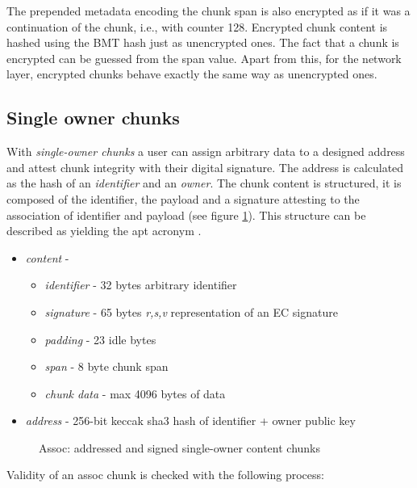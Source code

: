 The prepended metadata encoding the chunk span is also encrypted as if it was a continuation of the chunk, i.e., with counter 128. Encrypted chunk content is hashed using the BMT hash just as unencrypted ones. The fact that a chunk is encrypted can be guessed from the span value. Apart from this, for the network layer, encrypted chunks behave exactly the same way as unencrypted ones.

\subsection{Single owner chunks}\label{sec:single-owner-chunks}

With \emph{single-owner chunks} a user can assign arbitrary data to a designed address and attest chunk integrity with their digital signature. The address is calculated as the hash of an \emph{identifier} and an \emph{owner}. The chunk content is structured, it is composed of the identifier, the payload and a signature attesting to the association of identifier and payload (see figure \ref{fig:single-owner-chunks}). This structure can be described as  yielding the apt acronym .

\begin{itemize}
    \item \emph{content} - 
\begin{itemize}
    \item \emph{identifier} - 32 bytes arbitrary identifier 
    \item \emph{signature} - 65 bytes \emph{r,s,v} representation of an EC signature
    \item \emph{padding} - 23 idle bytes
    \item \emph{span} - 8 byte chunk span
    \item \emph{chunk data} - max 4096 bytes of data
\end{itemize}
    \item \emph{address} - 256-bit keccak sha3 hash of identifier + owner public key
\end{itemize}


\begin{figure}[htbp]
   \centering
   \caption[Assoc: addressed and signed single-owner content chunks]{Assoc: addressed and signed single-owner content chunks}
   \label{fig:single-owner-chunks}
\end{figure}

Validity of an assoc chunk is checked with the  following process:

